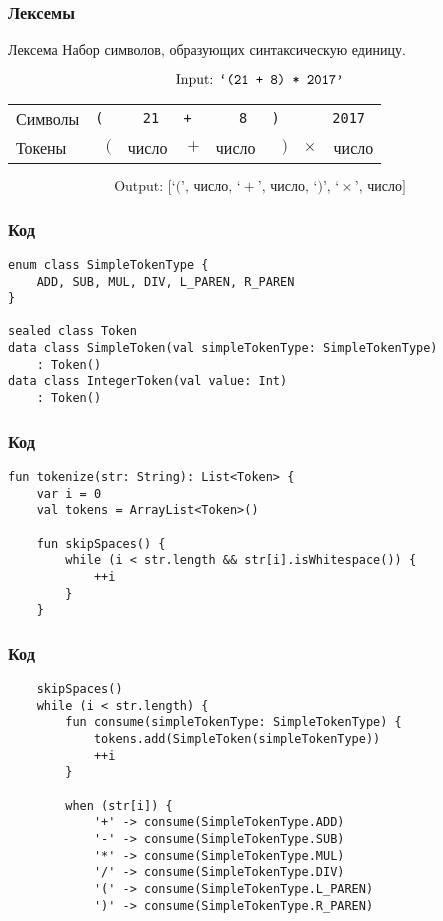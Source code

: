 \documentclass[pdf,russian]{beamer}
\begin{document}
\begin{frame}
    \frametitle{Лексемы}
    \begin{block}{Лексема}
        Набор символов, образующих синтаксическую единицу.
    \end{block}

    \pause

    \[
        \text{Input: \tt{`(21 + 8) * 2017'}}
    \]

    \pause

    \begin{table}
    \begin{tabular}{l @{\hspace{1cm}} rrrrrrr} \toprule
        Символы & \tt ( & \tt{21} & \tt + & \tt 8 & \tt ) & \tt *    & \tt{2017} \\
        Токены  &    $($& число   &    $+$& число &    $)$& $\times$ & число \\
        \bottomrule
    \end{tabular}
    \end{table}

    \pause

    \[
        \text{Output: [`$($', число, `$+$', число, `$)$', `$\times$', число]}
    \]
\end{frame}

\begin{frame}[fragile]
    \frametitle{Код}
    \pause
    \begin{verbatim}
enum class SimpleTokenType {
    ADD, SUB, MUL, DIV, L_PAREN, R_PAREN
}

sealed class Token
data class SimpleToken(val simpleTokenType: SimpleTokenType)
    : Token()
data class IntegerToken(val value: Int)
    : Token()
    \end{verbatim}
\end{frame}

\begin{frame}[fragile]
    \frametitle{Код}
    \begin{verbatim}
fun tokenize(str: String): List<Token> {
    var i = 0
    val tokens = ArrayList<Token>()

    fun skipSpaces() {
        while (i < str.length && str[i].isWhitespace()) {
            ++i
        }
    }
    \end{verbatim}
\end{frame}

\begin{frame}[fragile]
    \frametitle{Код}
    \begin{verbatim}
    skipSpaces()
    while (i < str.length) {
        fun consume(simpleTokenType: SimpleTokenType) {
            tokens.add(SimpleToken(simpleTokenType))
            ++i
        }

        when (str[i]) {
            '+' -> consume(SimpleTokenType.ADD)
            '-' -> consume(SimpleTokenType.SUB)
            '*' -> consume(SimpleTokenType.MUL)
            '/' -> consume(SimpleTokenType.DIV)
            '(' -> consume(SimpleTokenType.L_PAREN)
            ')' -> consume(SimpleTokenType.R_PAREN)
    \end{verbatim}
\end{frame}
\end{document}
